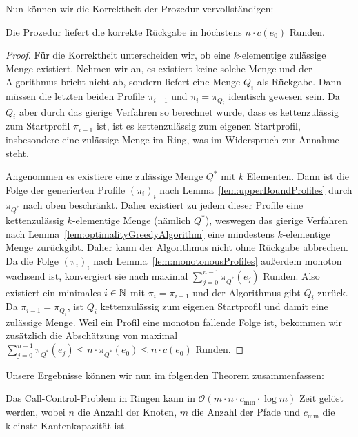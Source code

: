Nun können wir die Korrektheit der Prozedur vervollständigen:

\begin{lemma}\label{lem:decisionProcedure}
    Die Prozedur liefert die korrekte Rückgabe in höchstens $n\cdot c(e_0)$ Runden.
\end{lemma}
\begin{proof}
    Für die Korrektheit unterscheiden wir, ob eine $k$-elementige zulässige Menge existiert.
    Nehmen wir an, es existiert keine solche Menge und der Algorithmus bricht nicht ab, sondern liefert eine Menge $Q_i$
    als Rückgabe.
    Dann müssen die letzten beiden Profile $\pi_{i-1}$ und $\pi_{i} = \pi_{Q_i}$ identisch gewesen sein.
    Da $Q_i$ aber durch das gierige Verfahren so berechnet wurde, dass es kettenzulässig zum Startprofil
    $\pi_{i-1}$ ist, ist es kettenzulässig zum eigenen Startprofil, insbesondere eine zulässige Menge im Ring, was im
    Widerspruch zur Annahme steht.

    Angenommen es existiere eine zulässige Menge $Q^*$ mit $k$ Elementen.
    Dann ist die Folge der generierten Profile $(\pi_i)_{i}$ nach Lemma~\ref{lem:upperBoundProfiles} durch $\pi_{Q^*}$
    nach oben beschränkt.
    Daher existiert zu jedem dieser Profile eine kettenzulässig $k$-elementige Menge (nämlich $Q^*$),
    weswegen das gierige Verfahren nach Lemma~\ref{lem:optimalityGreedyAlgorithm} eine mindestens $k$-elementige Menge zurückgibt.
    Daher kann der Algorithmus nicht ohne Rückgabe abbrechen.
    Da die Folge $(\pi_i)_i$ nach Lemma~\ref{lem:monotonousProfiles} außerdem monoton wachsend ist, konvergiert sie nach
    maximal $\sum_{j=0}^{n-1}\pi_{Q^*}(e_j)$ Runden.
    Also existiert ein minimales $i\in \mathbb N$ mit $\pi_i = \pi_{i-1}$ und der Algorithmus gibt $Q_i$ zurück.
    Da $\pi_{i-1} = \pi_{Q_{i}}$, ist $Q_i$ kettenzulässig zum eigenen Startprofil und damit eine zulässige Menge.
    Weil ein Profil eine monoton fallende Folge ist, bekommen wir zusätzlich die Abschätzung von maximal
    $\sum_{j=0}^{n-1}\pi_{Q^*}(e_j) \leq n \cdot \pi_{Q^*}(e_0) \leq n \cdot c(e_0)$ Runden.
\end{proof}
Unsere Ergebnisse können wir nun im folgenden Theorem zusammenfassen:
\begin{theorem}
    Das Call-Control-Problem in Ringen kann in $\mathcal O(m \cdot n \cdot c_{\min} \cdot \log m)$ Zeit gelöst werden,
    wobei $n$ die Anzahl der Knoten, $m$ die Anzahl der Pfade und $c_{\min}$ die kleinste Kantenkapazität ist.
\end{theorem}
